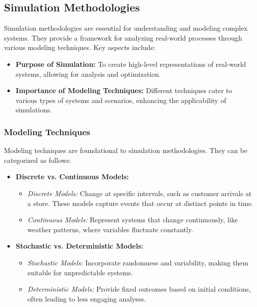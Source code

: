
\subsection{Simulation Methodologies}

Simulation methodologies are essential for understanding and modeling complex systems. They provide a framework for analyzing real-world processes through various modeling techniques. Key aspects include:

\begin{itemize}
    \item \textbf{Purpose of Simulation:} To create high-level representations of real-world systems, allowing for analysis and optimization.
    \item \textbf{Importance of Modeling Techniques:} Different techniques cater to various types of systems and scenarios, enhancing the applicability of simulations.
\end{itemize}

\subsubsection{Modeling Techniques}

Modeling techniques are foundational to simulation methodologies. They can be categorized as follows:

\begin{itemize}
    \item \textbf{Discrete vs. Continuous Models:} 
    \begin{itemize}
        \item \textit{Discrete Models:} Change at specific intervals, such as customer arrivals at a store. These models capture events that occur at distinct points in time.
        \item \textit{Continuous Models:} Represent systems that change continuously, like weather patterns, where variables fluctuate constantly.
    \end{itemize}
    
    \item \textbf{Stochastic vs. Deterministic Models:} 
    \begin{itemize}
        \item \textit{Stochastic Models:} Incorporate randomness and variability, making them suitable for unpredictable systems.
        \item \textit{Deterministic Models:} Provide fixed outcomes based on initial conditions, often leading to less engaging analyses.
    \end{itemize}
\end{itemize}

